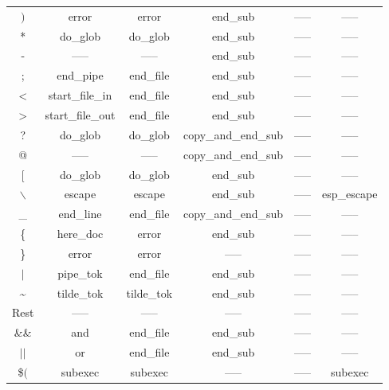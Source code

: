 \documentclass[12pt,a4paper]{report}
\begin{document}
\begin{table}[H]
\begin{tabular}{ |c|c|c|c|c|c| }
	$)$ & error \cellcolor[HTML]{FF0044}& error \cellcolor[HTML]{FF0044} & end\_sub \cellcolor[HTML]{FFF49C}& ----- & ----- \\
	* & do\_glob & do\_glob & end\_sub\cellcolor[HTML]{FFF49C} & ----- & ----- \\
	- & ----- & ----- &  end\_sub \cellcolor[HTML]{FFF49C}& ----- & ----- \\
	; & end\_pipe & end\_file\cellcolor[HTML]{BEE9F9} &  end\_sub \cellcolor[HTML]{FFF49C}& ----- & ----- \\
	< & start\_file\_in \cellcolor[HTML]{BEE9F9}& end\_file\cellcolor[HTML]{BEE9F9}&  end\_sub \cellcolor[HTML]{FFF49C}& ----- & ----- \\
	> & start\_file\_out \cellcolor[HTML]{BEE9F9}& end\_file \cellcolor[HTML]{BEE9F9}&  end\_sub \cellcolor[HTML]{FFF49C}& ----- & ----- \\
	? & do\_glob & do\_glob & copy\_and\_end\_sub \cellcolor[HTML]{FFF49C}& ----- & ----- \\
	@ & ----- & ----- & copy\_and\_end\_sub \cellcolor[HTML]{FFF49C}& ----- & ----- \\
	$[$ & do\_glob & do\_glob &  end\_sub \cellcolor[HTML]{FFF49C}& ----- & ----- \\
	$\backslash$ & escape & escape &  end\_sub \cellcolor[HTML]{FFF49C}& ----- & esp\_escape \\
	\_ & end\_line & end\_file \cellcolor[HTML]{BEE9F9}& copy\_and\_end\_sub \cellcolor[HTML]{FFF49C}& ----- & ----- \\
	\{ & here\_doc & error \cellcolor[HTML]{FF0044} &  end\_sub \cellcolor[HTML]{FFF49C}& ----- & ----- \\
	\} & error \cellcolor[HTML]{FF0044} & error \cellcolor[HTML]{FF0044} &  ----- & ----- & ----- \\
	$|$ & pipe\_tok & end\_file\cellcolor[HTML]{BEE9F9} &  end\_sub \cellcolor[HTML]{FFF49C}& ----- & ----- \\
	\textasciitilde  & tilde\_tok \cellcolor[HTML]{FFF49C}& tilde\_tok \cellcolor[HTML]{FFF49C} &  end\_sub \cellcolor[HTML]{FFF49C}& ----- & ----- \\
	Rest  & ----- & ----- &  ----- & ----- & ----- \\
	\hline
	\&\&  & and & end\_file \cellcolor[HTML]{BEE9F9}&  end\_sub\cellcolor[HTML]{FFF49C} & ----- & ----- \\
	$||$  & or & end\_file\cellcolor[HTML]{BEE9F9} &  end\_sub \cellcolor[HTML]{FFF49C}& ----- & ----- \\
	\$$($  & subexec\cellcolor[HTML]{C500FF} & subexec\cellcolor[HTML]{C500FF} &  ----- & ----- & subexec\cellcolor[HTML]{C500FF} \\

\end{tabular}
\end{table}
\end{document}
